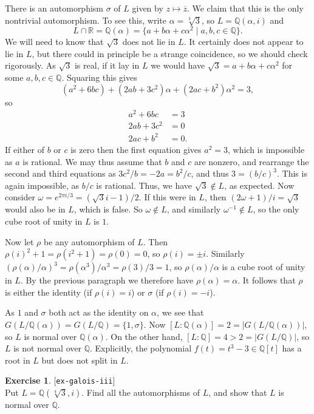 \documentclass{amsart}
\newcommand{\Q}         {{\mathbb{Q}}}
\newcommand{\R}         {{\mathbb{R}}}
\newcommand{\al}        {\alpha}
\newcommand{\sg}        {\sigma}
\newcommand{\om}        {\omega}
\newcommand{\ov}[1]     {\overline{#1}}
\newcommand{\st}        {\;|\;}
\renewcommand{\:}{\colon}
\newcommand{\lastexlabel}{}
\newcommand{\exlabel}[1]{
 \global\def\lastexlabel{#1}\label{#1}[\texttt{#1}]\ \\
}
\newcommand{\exlabel}[1]{
 \global\def\lastexlabel{#1}\label{#1}
}
\newenvironment{solution}{\SolutionInline}{\endSolutionInline}
\theoremstyle{definition}
\newtheorem{exercise}{Exercise}[section]
\renewenvironment{solution}{\SolutionAtEnd}{\endSolutionAtEnd}
\begin{document}
\begin{solution}
 There is an automorphism $\sg$ of $L$ given by $z\mapsto\ov{z}$.  We
 claim that this is the only nontrivial automorphism.  To see this,
 write $\al=\sqrt[3]{3}$, so $L=\Q(\al,i)$ and
 \[ L\cap\R = \Q(\al) = \{a+b\al+c\al^2\st a,b,c\in\Q\}. \]
 We will need to know that $\sqrt{3}$ does not lie in $L$.  It
 certainly does not appear to lie in $L$, but there could in principle
 be a strange coincidence, so we should check rigorously.  As
 $\sqrt{3}$ is real, if it lay in $L$ we would have
 $\sqrt{3}=a+b\al+c\al^2$ for some $a,b,c\in\Q$.  Squaring this gives 
 \[ (a^2+6bc) + (2ab+3c^2)\al + (2ac+b^2)\al^2 = 3, \]
 so 
 \begin{align*}
  a^2+6bc  &= 3 \\
  2ab+3c^2 &= 0 \\
  2ac+b^2  &= 0.
 \end{align*}
 If either of $b$ or $c$ is zero then the first equation gives
 $a^2=3$, which is impossible as $a$ is rational.  We may thus assume
 that $b$ and $c$ are nonzero, and rearrange the second and third
 equations as $3c^2/b=-2a=b^2/c$, and thus $3=(b/c)^3$.  This is again
 impossible, as $b/c$ is rational.  Thus, we have $\sqrt{3}\not\in L$,
 as expected.  Now consider $\om=e^{2\pi i/3}=(\sqrt{3}i-1)/2$.  If
 this were in $L$, then $(2\om+1)/i=\sqrt{3}$ would also be in $L$,
 which is false.  So $\om\not\in L$, and similarly
 $\om^{-1}\not\in L$, so the only cube root of unity in $L$ is $1$.

 Now let $\rho$ be any automorphism of $L$.  Then
 $\rho(i)^2+1=\rho(i^2+1)=\rho(0)=0$, so $\rho(i)=\pm i$.  Similarly
 $(\rho(\al)/\al)^3=\rho(\al^3)/\al^3=\rho(3)/3=1$, so $\rho(\al)/\al$ 
 is a cube root of unity in $L$.  By the previous paragraph we
 therefore have $\rho(\al)=\al$.  It follows that $\rho$ is either the
 identity (if $\rho(i)=i$) or $\sg$ (if $\rho(i)=-i$).

 As $1$ and $\sg$ both act as the identity on $\al$, we see that
 $G(L/\Q(\al))=G(L/\Q)=\{1,\sg\}$.  Now
 $[L:\Q(\al)]=2=|G(L/\Q(\al))|$, so $L$ is normal over $\Q(\al)$.  On
 the other hand, $[L:\Q]=4>2=|G(L/\Q)|$, so $L$ is not normal over
 $\Q$.  Explicitly, the polynomial $f(t)=t^3-3\in\Q[t]$ has a root in
 $L$ but does not split in $L$.
\end{solution}
\begin{exercise}\exlabel{ex-galois-iii}
 Put $L=\Q(\sqrt[4]{3},i)$.  Find all the automorphisms of $L$, and
 show that $L$ is normal over $\Q$.
\end{exercise}
\end{document}
